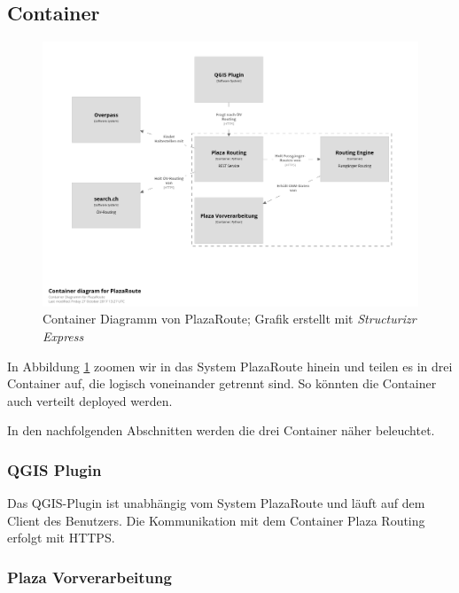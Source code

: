 \subsection{Container}
\label{architektur:Container}

\begin{figure}[ht]
    \centering
    \includegraphics[width=1\linewidth]{projectdoc/img/container_diagram.png}
    \caption[Container Diagramm]{Container Diagramm von PlazaRoute; Grafik erstellt mit \emph{Structurizr Express}\cite{structurizr}}
    \label{fig:container_diagram}
    \end{figure}    

In Abbildung \ref{fig:container_diagram} zoomen wir in das System PlazaRoute hinein und teilen es in drei Container auf, die logisch voneinander getrennt sind. So könnten die Container auch verteilt deployed werden.

In den nachfolgenden Abschnitten werden die drei Container näher beleuchtet.


\subsubsection{QGIS Plugin}
\label{architektur:QGIS Plugin}
Das QGIS-Plugin ist unabhängig vom System PlazaRoute und läuft auf dem Client des Benutzers. Die Kommunikation mit dem Container Plaza Routing erfolgt mit HTTPS.

\subsubsection{Plaza Vorverarbeitung}
\label{architektur:Plaza Vorverarbeitung}

